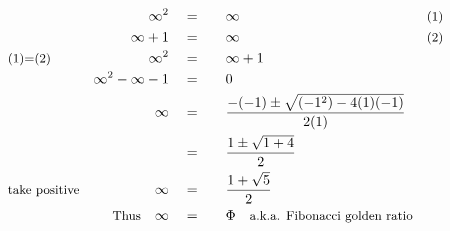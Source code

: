 \begin{alignat*}{5}
&\,&\infty^2\quad&=\quad&&\infty\quad&&\small\text{(1)}\\
&\,&\infty+1\quad&=&&\infty&&\small\text{(2)}\\
&\small\text{(1)=(2)}\normalsize\quad&\infty^2\quad&=&&\infty+1\\
&\,&\infty^2-\infty-1\quad&=&&0\\
&\,&\infty\quad&=&&\frac{-(-1)\pm\sqrt{(-1^2)-4(1)(-1)}}{2(1)}\\
&\,&\,&=&&\frac{1\pm\sqrt{1+4}}{2}\\
&\small\text{take positive}&\infty\quad&=&&\frac{1+\sqrt{5}}{2}\\
&\,&\small\text{Thus}\normalsize\quad\infty\quad&=&&\Phi\quad\small\text{a.k.a. Fibonacci golden ratio}
\end{alignat*}
